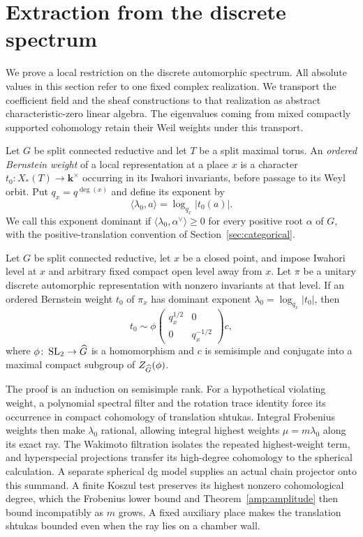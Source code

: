 \section{Extraction from the discrete spectrum}\label{sec:extraction}

We prove a local restriction on the discrete automorphic spectrum.
All absolute values in this section refer to one fixed complex
realization.  We transport the coefficient field and the sheaf
constructions to that realization as abstract characteristic-zero linear
algebra.  The eigenvalues coming from mixed compactly supported
cohomology retain their Weil weights under this transport.

Let $G$ be split connected reductive and let $T$ be a split maximal
torus.  An \emph{ordered Bernstein weight} of a local representation
at a place $x$ is a character $t_0:X_*(T)\to\mathbf k^\times$
occurring in its Iwahori invariants,
before passage to its Weyl orbit.  Put $q_x=q^{\deg(x)}$ and define its
exponent by
\[
 \langle\lambda_0,a\rangle=\log_{q_x}|t_0(a)|.
\]
We call this exponent dominant if
$\langle\lambda_0,\alpha^\vee\rangle\ge0$ for every positive root
$\alpha$ of $G$, with the positive-translation convention of
Section~\ref{sec:categorical}.

\begin{theorem}\label{ext:discrete}
 Let $G$ be split connected reductive, let $x$ be a closed point, and
 impose Iwahori level at $x$ and arbitrary fixed compact open level
 away from $x$.  Let $\pi$ be a unitary discrete automorphic
 representation with nonzero invariants at that level.  If an ordered
 Bernstein weight $t_0$ of $\pi_x$ has dominant exponent
 $\lambda_0=\log_{q_x}|t_0|$, then
 \begin{equation}\label{ext:local-form}
 t_0\sim
 \phi\begin{pmatrix}q_x^{1/2}&0\\0&q_x^{-1/2}\end{pmatrix}c,
 \end{equation}
 where $\phi\colon\operatorname{SL}_2\to\widehat G$ is a homomorphism and
 $c$ is semisimple and conjugate into a maximal compact subgroup of
 $Z_{\widehat G}(\phi)$.
\end{theorem}

The proof is an induction on semisimple rank.  For a hypothetical
violating weight, a polynomial spectral filter and the rotation trace
identity force its occurrence in compact cohomology of translation
shtukas.  Integral Frobenius weights then make $\lambda_0$ rational,
allowing integral highest weights $\mu=m\lambda_0$ along its exact ray.
The Wakimoto filtration isolates the repeated highest-weight term,
and hyperspecial projections transfer its high-degree cohomology to
the spherical calculation.  A separate spherical dg model supplies
an actual chain projector onto this summand.  A finite Koszul test
preserves its highest nonzero cohomological degree, which the
Frobenius lower bound and Theorem~\ref{amp:amplitude} then bound
incompatibly as $m$ grows.  A fixed auxiliary place makes the translation
shtukas bounded even when the ray lies on a chamber wall.

